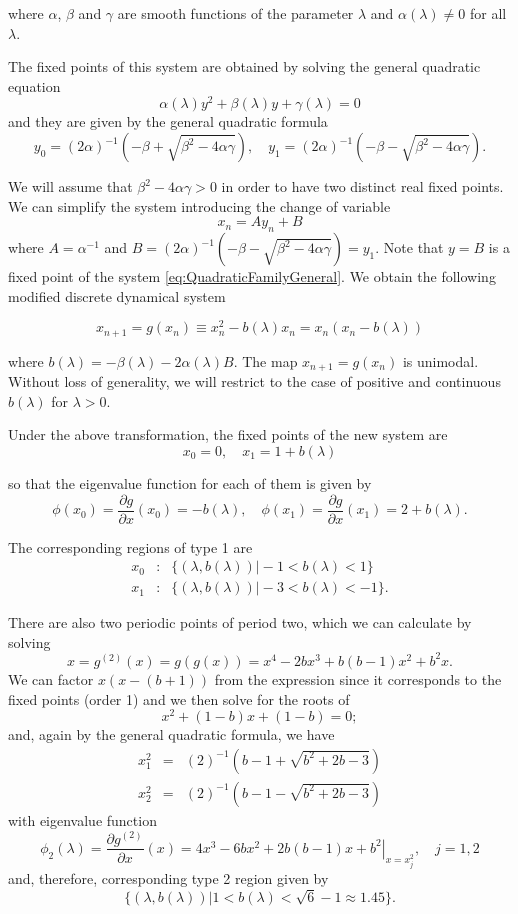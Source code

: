 \documentclass[10pt,twoside,titlepage]{book}
\numberwithin{equation}{chapter}
\numberwithin{figure}{chapter}
\numberwithin{table}{chapter}
\theoremstyle{plain}%
\theoremstyle{definition}
\theoremstyle{remark}
\begin{document}
where $\alpha$, $\beta$ and $\gamma$ are smooth functions of the parameter $\lambda$ and $\alpha(\lambda)\neq0$ for all $\lambda$.

The fixed points of this system are obtained by solving the general quadratic equation
\[\alpha(\lambda)y^{2}+\beta(\lambda)y+\gamma(\lambda)=0\]
and they are given by the general quadratic formula
\[y_{0}=(2\alpha)^{-1}\left(-\beta+\sqrt{\beta^{2}-4\alpha\gamma}\right),\quad y_{1}=(2\alpha)^{-1}\left(-\beta-\sqrt{\beta^{2}-4\alpha\gamma}\right).\]

We will assume that $\beta^{2}-4\alpha\gamma>0$ in order to have two distinct real fixed points. We can simplify the system introducing the change of variable
\[x_{n}=Ay_{n}+B\]
where $A=\alpha^{-1}$ and $B=(2\alpha)^{-1}\left(-\beta-\sqrt{\beta^{2}-4\alpha\gamma}\right)=y_{1}$.
Note that $y=B$ is a fixed point of the system \eqref{eq:QuadraticFamilyGeneral}.
We obtain the following modified discrete dynamical system \cite{Solis2004}

\begin{equation}
	x_{n+1}=g(x_{n})\equiv x_{n}^{2}-b(\lambda)x_{n}=x_{n}(x_{n}-b(\lambda))
	\label{eq:QuadraticFamilyModified}
\end{equation}

where $b(\lambda)=-\beta(\lambda)-2\alpha(\lambda)B$. The map $x_{n+1}=g(x_{n})$ is unimodal. Without loss of generality, we will restrict to the case of positive and continuous $b(\lambda)$ for $\lambda>0$.

Under the above transformation, the fixed points of the new system are
\begin{equation}
	x_{0}=0,\quad x_{1}=1+b(\lambda)
	\label{eq:FixedPointsModifiedQuadratic}
\end{equation}

so that the eigenvalue function for each of them is given by
\[\phi(x_{0})=\frac{\partial g}{\partial x}(x_{0})=-b(\lambda),\quad\phi(x_{1})=\frac{\partial g}{\partial x}(x_{1})=2+b(\lambda).\]

The corresponding regions of type 1 are
\begin{eqnarray*}
	x_{0} & : & \{(\lambda,b(\lambda))\vert-1<b(\lambda)<1\}\\
	x_{1} & : & \{(\lambda,b(\lambda))\vert-3<b(\lambda)<-1\}.
\end{eqnarray*}

There are also two periodic points of period two, which we can calculate by solving
\[x=g^{(2)}(x)=g(g(x))=x^{4}-2bx^{3}+b(b-1)x^{2}+b^{2}x.\]
We can factor $x(x-(b+1))$ from the expression since it corresponds to the fixed points (order 1) and we then solve for the roots of
\[x^{2}+(1-b)x+(1-b)=0;\]
and, again by the general quadratic formula, we have
\begin{eqnarray*}
	x_{1}^{2} & = & (2)^{-1}\left(b-1+\sqrt{b^{2}+2b-3}\right)\\
	x_{2}^{2} & = & (2)^{-1}\left(b-1-\sqrt{b^{2}+2b-3}\right)
\end{eqnarray*}
with eigenvalue function
\[\phi_{2}(\lambda)=\frac{\partial g^{(2)}}{\partial x}(x)=\left.4x^{3}-6bx^{2}+2b(b-1)x+b^{2}\right|_{x=x_{j}^{2}},\quad j=1,2\]
and, therefore, corresponding type 2 region given by
\[\{(\lambda,b(\lambda))\vert1<b(\lambda)<\sqrt{6}-1\approx1.45\}.\]
\end{document}
